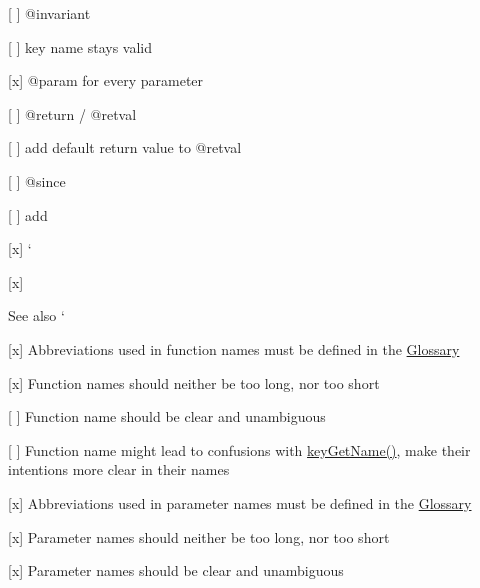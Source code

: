 \begin{DoxyItemize}
\begin{DoxyItemize}
\end{DoxyItemize}
\item \mbox{[} \mbox{]} {\ttfamily @invariant}
\begin{DoxyItemize}
\item \mbox{[} \mbox{]} key name stays valid
\end{DoxyItemize}
\item \mbox{[}x\mbox{]} {\ttfamily @param} for every parameter
\item \mbox{[} \mbox{]} {\ttfamily @return} / {\ttfamily @retval}
\begin{DoxyItemize}
\item \mbox{[} \mbox{]} add default return value to {\ttfamily @retval}
\end{DoxyItemize}
\item \mbox{[} \mbox{]} {\ttfamily @since}
\begin{DoxyItemize}
\item \mbox{[} \mbox{]} add
\end{DoxyItemize}
\item \mbox{[}x\mbox{]} `{\ttfamily }
\item {\ttfamily \mbox{[}x\mbox{]}}\begin{DoxySeeAlso}{See also}
`
\end{DoxySeeAlso}

\end{DoxyItemize}


\begin{DoxyItemize}
\item \mbox{[}x\mbox{]} Abbreviations used in function names must be defined in the \hyperlink{doc_help_elektra-glossary_md}{Glossary}
\item \mbox{[}x\mbox{]} Function names should neither be too long, nor too short
\item \mbox{[} \mbox{]} Function name should be clear and unambiguous
\begin{DoxyItemize}
\item \mbox{[} \mbox{]} Function name might lead to confusions with {\ttfamily \hyperlink{group__keyname_gab29a850168d9b31c9529e90cf9ab68be}{key\+Get\+Name()}}, make their intentions more clear in their names
\end{DoxyItemize}
\item \mbox{[}x\mbox{]} Abbreviations used in parameter names must be defined in the \hyperlink{doc_help_elektra-glossary_md}{Glossary}
\item \mbox{[}x\mbox{]} Parameter names should neither be too long, nor too short
\item \mbox{[}x\mbox{]} Parameter names should be clear and unambiguous
\end{DoxyItemize}

